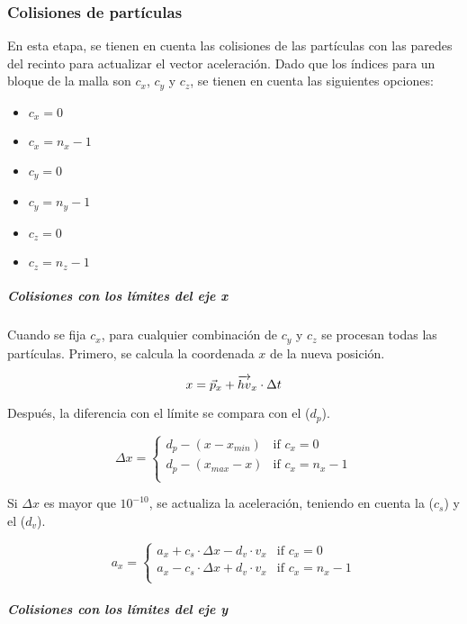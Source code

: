 \subsubsection{Colisiones de partículas}

En esta etapa, se tienen en cuenta las colisiones de las partículas con las
paredes del recinto para actualizar el vector aceleración.
Dado que los índices para un bloque de la malla son
$c_x$, $c_y$ y $c_z$, se tienen en cuenta las siguientes opciones:

\begin{itemize}
\item $c_x=0$
\item $c_x=n_x-1$
\item $c_y=0$
\item $c_y=n_y-1$
\item $c_z=0$
\item $c_z=n_z-1$
\end{itemize}

\subparagraph{Colisiones con los límites del eje x}

Cuando se fija $c_x$, para cualquier combinación de $c_y$ y $c_z$ se
procesan todas las partículas. Primero, se calcula la coordenada $x$ de la 
nueva posición.

\[
x = \vec{p}_x + \overrightarrow{hv}_x \cdot \Delta t \\
\]

Después, la diferencia con el límite se compara con el  ($d_p$).

\[
\Delta x = 
\begin{cases}
d_p - (x - x_{min}) & \text{if } c_x = 0\\
d_p - (x_{max} - x) & \text{if } c_x = n_x -1\\
\end{cases}
\]

Si $\Delta x$ es mayor que $10^{-10}$, se actualiza la aceleración,
teniendo en cuenta la  ($c_s$) y el
 ($d_v$).

\[
a_x = 
\begin{cases}
  a_x + c_s \cdot \Delta x - d_v \cdot v_x & \text{if  } c_x = 0\\
  a_x - c_s \cdot \Delta x + d_v \cdot v_x & \text{if  } c_x = n_x-1\\
\end{cases}
\]

\subparagraph{Colisiones con los límites del eje y}

